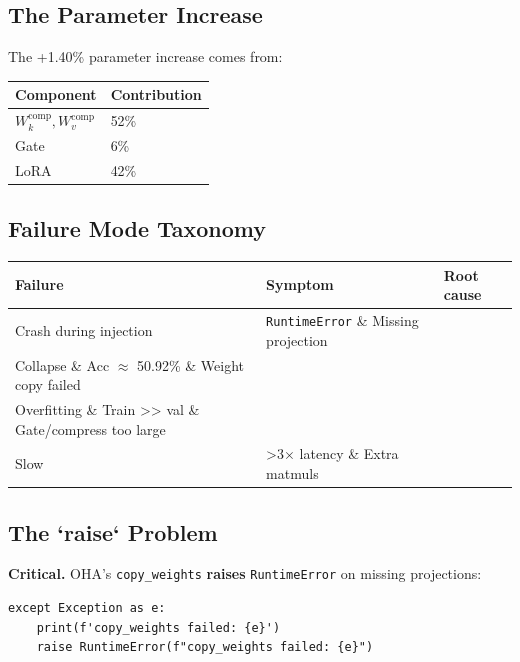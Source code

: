 \subsection{The Parameter Increase}

The +1.40\% parameter increase comes from:

\begin{table}[H]
\centering
\small
\begin{tabular}{ll}
\toprule
\textbf{Component} & \textbf{Contribution} \\
\midrule
$W_k^\text{comp}, W_v^\text{comp}$ & 52\% \\
Gate & 6\% \\
LoRA & 42\% \\
\bottomrule
\end{tabular}
\end{table}

\subsection{Failure Mode Taxonomy}

\begin{table}[H]
\centering
\small
\begin{tabular}{lll}
\toprule
\textbf{Failure} & \textbf{Symptom} & \textbf{Root cause} \\
\midrule
Crash during injection & \texttt{RuntimeError} \& Missing projection \\
Collapse \& Acc $\approx$ 50.92\% \& Weight copy failed \\
Overfitting \& Train >> val \& Gate/compress too large \\
Slow & >3$\times$ latency \& Extra matmuls \\
\bottomrule
\end{tabular}
\end{table}

\subsection{The `raise` Problem}

\textbf{Critical.} OHA's \texttt{copy\_weights} \textbf{raises} \texttt{RuntimeError} on missing 
projections:

\begin{lstlisting}
except Exception as e:
    print(f'copy_weights failed: {e}')
    raise RuntimeError(f"copy_weights failed: {e}")
\end{lstlisting}

